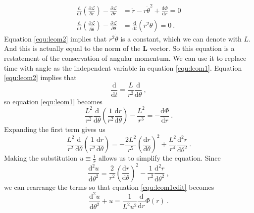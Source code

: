 \documentclass[english, oneside]{HYgradu}
\begin{document}
\begin{align}
\frac{\mathrm{d} }{\mathrm{d} t} \left( \frac{\partial \mathcal{L}}{\partial \dot{r}} \right) - \frac{\partial \mathcal{L}}{\partial r} &= \ddot{r} - r \dot{\theta}^2 + \frac{\mathrm{d} \Phi}{\mathrm{d} r} = 0 \label{equ:leom1} \\
\frac{\mathrm{d} }{\mathrm{d} t} \left( \frac{\partial \mathcal{L}}{\partial \dot{\theta}} \right) - \frac{\partial \mathcal{L}}{\partial \theta} &= \frac{\mathrm{d}}{\mathrm{d} t} (r^2 \dot{\theta}) = 0 \label{equ:leom2} \ .
\end{align}
Equation \ref{equ:leom2} implies that $r^2 \dot{\theta}$ is a constant, which we can denote with $L$. And this is actually equal to the norm of the $\mathbf{L}$ vector. So this equation is a restatement of the conservation of angular momentum. We can use it to replace time with angle as the independent variable in equation \ref{equ:leom1}. Equation \ref{equ:leom2} implies that
\begin{equation}
\frac{\mathrm{d}}{\mathrm{d} t} = \frac{L}{r^2} \frac{\mathrm{d}}{\mathrm{d} \theta} \ ,
\end{equation}
so equation \ref{equ:leom1} becomes
\begin{equation}
\frac{L^2}{r^2} \frac{\mathrm{d}}{\mathrm{d} \theta} \left( \frac{1}{r^2} \frac{\mathrm{d} r}{\mathrm{d} \theta} \right) - \frac{L^2}{r^3} = -\frac{\mathrm{d} \Phi}{\mathrm{d} r} \label{equ:leom1edit} \ .
\end{equation}
Expanding the first term gives us 
\begin{equation}
\frac{L^2}{r^2} \frac{\mathrm{d}}{\mathrm{d} \theta} \left( \frac{1}{r^2} \frac{\mathrm{d} r}{\mathrm{d} \theta} \right) = -\frac{2 L^2}{r^5} \left( \frac{\mathrm{d} r}{\mathrm{d} \theta} \right)^2 + \frac{L^2}{r^4} \frac{\mathrm{d}^2 r}{\mathrm{d} \theta^2} \ .
\end{equation}
Making the substitution $u \equiv \frac{1}{r}$ allows us to simplify the equation. Since
\begin{equation}
\frac{\mathrm{d}^2 u}{\mathrm{d} \theta^2} = \frac{2}{r^2} \left( \frac{\mathrm{d} r}{\mathrm{d} \theta} \right)^2 - \frac{1}{r^2} \frac{\mathrm{d}^2 r}{\mathrm{d} \theta^2} \ ,
\end{equation}
we can rearrange the terms so that equation \ref{equ:leom1edit} becomes
\begin{equation}
\frac{\mathrm{d}^2 u}{\mathrm{d} \theta^2} + u = \frac{1}{L^2 u^2} \frac{\mathrm{d}}{\mathrm{d} r} \Phi (r) \ .
\end{equation}
\end{document}
